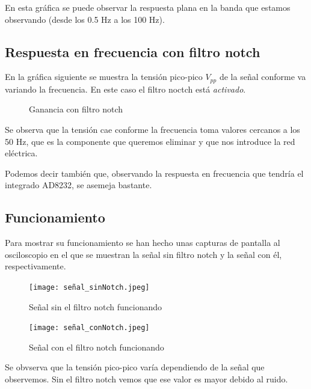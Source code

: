 \documentclass[conference]{IEEEtran}
\begin{document}
En esta gráfica se puede observar la respuesta plana en la banda que estamos observando (desde los 0.5 Hz a los 100 Hz).

\subsection{Respuesta en frecuencia con filtro notch}
En la gráfica siguiente se muestra la tensión pico-pico $V_{pp}$ de la señal conforme va variando la frecuencia. En este caso el filtro noctch está \textit{activado}.
 
\begin{figure}[H]
    \caption{Ganancia con filtro notch}
    \label{g_conNotch}
    \end{figure}

Se observa que la tensión cae conforme la frecuencia toma valores cercanos a los 50 Hz, que es la componente que queremos eliminar y que nos introduce la red eléctrica.

Podemos decir también que, observando la respuesta en frecuencia que tendría el integrado AD8232, se asemeja bastante.

\subsection{Funcionamiento}
Para mostrar su funcionamiento se han hecho unas capturas de pantalla al osciloscopio en el que se muestran la señal sin filtro notch y la señal con él, respectivamente.

\begin{figure}[htbp]
    \centerline{\texttt{[image: señal\_sinNotch.jpeg]}}
    \caption{Señal sin el filtro notch funcionando}
    \label{s_sinNotch}
    \end{figure}

\begin{figure}[htbp]
    \centerline{\texttt{[image: señal\_conNotch.jpeg]}}
    \caption{Señal con el filtro notch funcionando}
    \label{s_conNotch}
    \end{figure}

Se obvserva que la tensión pico-pico varía dependiendo de la señal que observemos. Sin el filtro notch vemos que ese valor es mayor debido al ruido.
\end{document}
